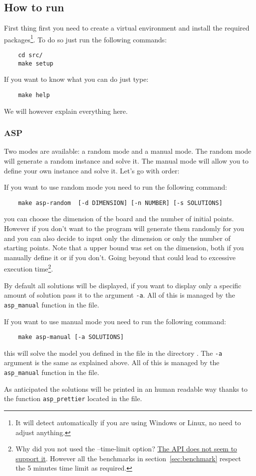 \subsection{How to run}
First thing first you need to create a virtual environment and install the required packages\footnote{It will detect automatically if you are using Windows or Linux, no need to adjust anything.}. To do so just run the following commands:
\begin{verbatim}
    cd src/
    make setup
\end{verbatim}

If you want to know what you can do just type:

\begin{verbatim}
    make help 
\end{verbatim}

We will however explain everything here.

\subsubsection{ASP}
Two modes are available: a random mode and a manual mode. The random mode will generate a random instance and solve it. The manual mode will allow you to define your own instance and solve it.
Let's go with order:

If you want to use random mode you need to run the following command:
\begin{verbatim}
    make asp-random  [-d DIMENSION] [-n NUMBER] [-s SOLUTIONS]
\end{verbatim}

you can choose the dimension of the board and the number of initial points. However if you don't want to the program will generate them randomly for you and you can also decide to input only the dimension or only the number of starting points. Note that a upper bound was set on the dimension, both if you manually define it or if you don't. Going beyond that could lead to excessive execution time\footnote{Why did you not used the --time-limit option? \href{https://github.com/potassco/clingo/issues/151}{The API does not seem to support it}. However all the benchmarks in section~\ref{sec:benchmark} respect the 5 minutes time limit as required.}.

By default all solutions will be displayed, if you want to display only a specific amount of solution pass it to the argument \texttt{-a}. All of this is managed by the \texttt{asp_manual} function in the  file.

If you want to use manual mode you need to run the following command:
\begin{verbatim}
    make asp-manual [-a SOLUTIONS]
\end{verbatim}
this will solve the model you defined in the file  in the directory . The \texttt{-a} argument is the same as explained above. All of this is managed by the \texttt{asp_manual} function in the  file.

As anticipated the solutions will be printed in an human readable way thanks to the function \texttt{asp_prettier} located in the  file.
